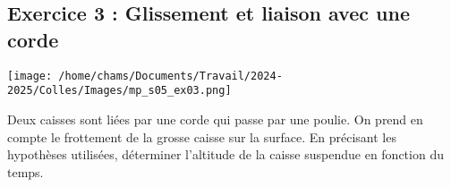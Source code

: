 \subsection{Exercice 3 : Glissement et liaison avec une corde}

\begin{minipage}[c]{\linewidth/2}
	\texttt{[image: /home/chams/Documents/Travail/2024-2025/Colles/Images/mp\_s05\_ex03.png]}
\end{minipage}%
\begin{minipage}[c]{\linewidth/2}
	Deux caisses sont liées par une corde qui passe par une poulie. On prend en compte le frottement de la grosse caisse sur la surface. En précisant les hypothèses utilisées, déterminer l'altitude de la caisse suspendue en fonction du temps.
\end{minipage}